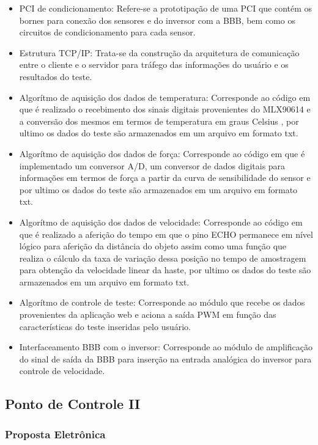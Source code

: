 	\begin{itemize}

		\item PCI de condicionamento: Refere-se a prototipação de uma PCI que contém os bornes para conexão dos sensores e do inversor com a BBB, bem como os circuitos de condicionamento para cada sensor.
		\item Estrutura TCP/IP: Trata-se da construção da arquitetura de comunicação entre o cliente e o servidor para tráfego das informações do usuário e os resultados do teste.
		\item Algorítmo de aquisição dos dados de temperatura: Corresponde ao código em que é realizado o recebimento dos sinais digitais provenientes do MLX90614 e a conversão dos mesmos em termos de temperatura em graus Celsius , por ultimo os dados do teste são armazenados em um arquivo em formato txt.
		\item Algorítmo de aquisição dos dados de força: Corresponde ao código em que é implementado um conversor A/D, um conversor de dados digitais para informações em termos de força a partir da curva de sensibilidade do sensor e por ultimo os dados do teste são armazenados em um arquivo em formato txt.
		\item Algorítmo de aquisição dos dados de velocidade: Corresponde ao código em que é realizado a aferição do tempo em que o pino ECHO permanece em nível lógico para aferição da distância do objeto assim como uma função que realiza o cálculo da taxa de variação dessa posição no tempo de amostragem para obtenção da velocidade linear da haste, por ultimo os dados do teste são armazenados em um arquivo em formato txt.
		\item Algorítmo de controle de teste: Corresponde ao módulo que recebe os dados provenientes da aplicação web e aciona a saída PWM em função das características do teste inseridas pelo usuário.
		\item Interfaceamento BBB com o inversor: Corresponde ao módulo de amplificação do sinal de saída da BBB para inserção na entrada analógica do inversor para controle de velocidade.
	\end{itemize}

\subsection{Ponto de Controle II}
\subsubsection{Proposta Eletrônica}

